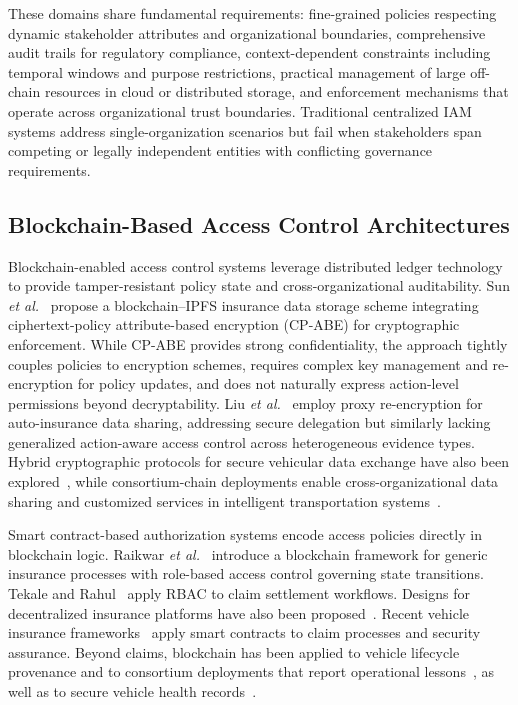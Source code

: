 \documentclass[pdflatex,sn-mathphys-num]{sn-jnl}
\begin{document}
These domains share fundamental requirements: fine-grained policies respecting dynamic stakeholder attributes and organizational boundaries, comprehensive audit trails for regulatory compliance, context-dependent constraints including temporal windows and purpose restrictions, practical management of large off-chain resources in cloud or distributed storage, and enforcement mechanisms that operate across organizational trust boundaries. Traditional centralized IAM systems address single-organization scenarios but fail when stakeholders span competing or legally independent entities with conflicting governance requirements.

\subsection{Blockchain-Based Access Control Architectures}
Blockchain-enabled access control systems leverage distributed ledger technology to provide tamper-resistant policy state and cross-organizational auditability. Sun \emph{et al.}~\cite{sun2020insurance} propose a blockchain--IPFS insurance data storage scheme integrating ciphertext-policy attribute-based encryption (CP-ABE) for cryptographic enforcement. While CP-ABE provides strong confidentiality, the approach tightly couples policies to encryption schemes, requires complex key management and re-encryption for policy updates, and does not naturally express action-level permissions beyond decryptability. Liu \emph{et al.}~\cite{liu2021auto} employ proxy re-encryption for auto-insurance data sharing, addressing secure delegation but similarly lacking generalized action-aware access control across heterogeneous evidence types. Hybrid cryptographic protocols for secure vehicular data exchange have also been explored~\cite{brousmiche2018hybrid}, while consortium-chain deployments enable cross-organizational data sharing and customized services in intelligent transportation systems~\cite{wang2020secure}.

Smart contract-based authorization systems encode access policies directly in blockchain logic. Raikwar \emph{et al.}~\cite{raikwar2018insurance} introduce a blockchain framework for generic insurance processes with role-based access control governing state transitions. Tekale and Rahul~\cite{tekale2023claims} apply RBAC to claim settlement workflows. Designs for decentralized insurance platforms have also been proposed~\cite{alwis2022decentralized}. Recent vehicle insurance frameworks~\cite{thukral2023vehicle, hombalimath2024vehicleclaim} apply smart contracts to claim processes and security assurance. Beyond claims, blockchain has been applied to vehicle lifecycle provenance and to consortium deployments that report operational lessons~\cite{syed2020vehicle, brousmiche2018digitizing}, as well as to secure vehicle health records~\cite{singh2020vcare}.
\end{document}
